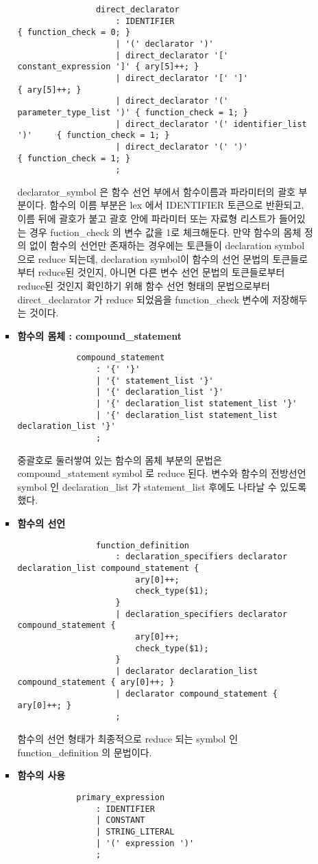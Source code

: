\documentclass{article}
\begin{document}
\begin{itemize}
\begin{itemize}
\begin{itemize}
\begin{lstlisting}
				direct_declarator
					: IDENTIFIER									{ function_check = 0; }
					| '(' declarator ')'		
					| direct_declarator '[' constant_expression ']'	{ ary[5]++; }
					| direct_declarator '[' ']'						{ ary[5]++; }
					| direct_declarator '(' parameter_type_list ')' { function_check = 1; }
					| direct_declarator '(' identifier_list ')'		{ function_check = 1; }
					| direct_declarator '(' ')'						{ function_check = 1; }
					;
			\end{lstlisting}
			declarator\_symbol 은 함수 선언 부에서 함수이름과 파라미터의 괄호 부분이다.
			함수의 이름 부분은 lex 에서 IDENTIFIER 토큰으로 반환되고, 이름 뒤에 괄호가 붙고 괄호 안에 파라미터
			또는 자료형 리스트가 들어있는 경우 fuction\_check 의 변수 값을 1로 체크해둔다. 만약 함수의 몸체 정의 없이
			함수의 선언만 존재하는 경우에는 토큰들이 declaration symbol 으로 reduce 되는데, declaration symbol이
			함수의 선언 문법의 토큰들로 부터 reduce된 것인지, 아니면 다른 변수 선언 문법의 토큰들로부터 reduce된 것인지
			확인하기 위해 함수 선언 형태의 문법으로부터 direct\_declarator 가 reduce 되었음을 function\_check
			변수에 저장해두는 것이다.

			\item {\bf 함수의 몸체 : compound\_statement}
			\begin{lstlisting}
			compound_statement
				: '{' '}'
				| '{' statement_list '}'
				| '{' declaration_list '}'
				| '{' declaration_list statement_list '}'
				| '{' declaration_list statement_list declaration_list '}'
				;
			\end{lstlisting}
			중괄호로 둘러쌓여 있는 함수의 몸체 부분의 문법은 compound\_statement symbol 로 reduce 된다.
			변수와 함수의 전방선언 symbol 인 declaration\_list 가 statement\_list 후에도 나타날 수 있도록 했다.

			\item {\bf 함수의 선언}
			\begin{lstlisting}
				function_definition
					: declaration_specifiers declarator declaration_list compound_statement {
						ary[0]++;
						check_type($1);
					}
					| declaration_specifiers declarator compound_statement {
						ary[0]++;
						check_type($1);
					}
					| declarator declaration_list compound_statement { ary[0]++; }
					| declarator compound_statement	{ ary[0]++; }
					;
			\end{lstlisting}
			함수의 선언 형태가 최종적으로 reduce 되는 symbol 인 function\_definition 의 문법이다.
		
			\item {\bf 함수의 사용}
			\begin{lstlisting}
			primary_expression
				: IDENTIFIER
				| CONSTANT
				| STRING_LITERAL
				| '(' expression ')'
				;


\end{lstlisting}
\end{itemize}
\end{itemize}
\end{itemize}
\end{document}
